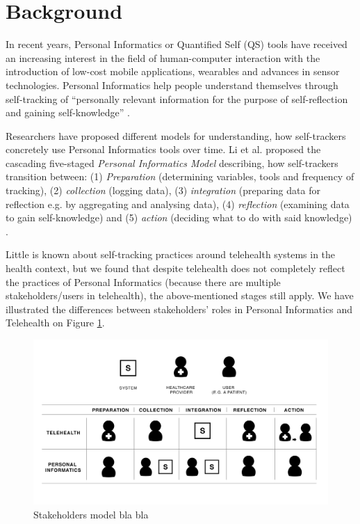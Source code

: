\section{Background}
In recent years, Personal Informatics or Quantified Self (QS) tools have received an increasing interest in the field of human-computer interaction with the introduction of low-cost mobile applications, wearables and advances in sensor technologies. Personal Informatics help people understand themselves through self-tracking of “personally relevant information for the purpose of self-reflection and gaining self-knowledge” \cite{Li2010}. 

Researchers have proposed different models for understanding, how self-trackers concretely use Personal Informatics tools over time. Li et al. proposed the cascading five-staged \textit{Personal Informatics Model} describing, how self-trackers transition between: (1) \textit{Preparation} (determining variables, tools and frequency of tracking), (2) \textit{collection} (logging data), (3) \textit{integration} (preparing data for reflection e.g. by aggregating and analysing data), (4) \textit{reflection} (examining data to gain self-knowledge) and (5) \textit{action} (deciding what to do with said knowledge) \cite{Li2010}. 

Little is known about self-tracking practices around telehealth systems in the health context, but we found that despite telehealth does not completely reflect the practices of Personal Informatics (because there are multiple stakeholders/users in telehealth), the above-mentioned stages still apply. We have illustrated the differences between stakeholders’ roles in Personal Informatics and Telehealth on Figure \ref{fig:StakeholdersModel}. 


\begin{figure}[!h]
\centering
\includegraphics[width=0.9\columnwidth]{img/StakeholdersModel}
\caption{Stakeholders model bla bla}
\label{fig:StakeholdersModel}
\end{figure}

